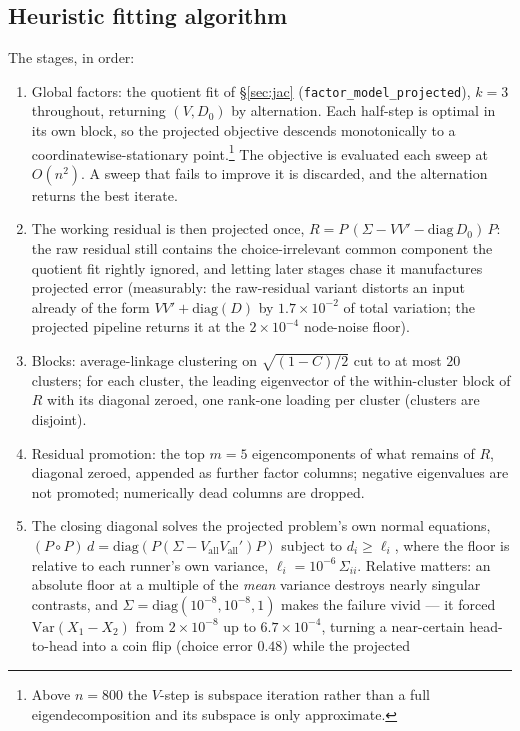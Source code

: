 \documentclass[11pt]{article}
\begin{document}
\subsection{Heuristic fitting algorithm}

The stages, in order:
\begin{enumerate}
\item Global factors: the quotient fit of \S\ref{sec:jac}
(\texttt{factor\_model\_projected}), $k=3$ throughout, returning $(V,D_0)$
by alternation. Each half-step is optimal in its own block, so the projected objective descends monotonically to a
coordinatewise-stationary point.\footnote{Above $n=800$ the $V$-step is subspace
iteration rather than a full eigendecomposition and its subspace is only
approximate.} The objective is
evaluated each sweep at $O(n^2)$. A sweep that fails to improve it is
discarded, and the alternation returns the best iterate.
\item The working residual is then
projected once, $R=P\,(\Sigma-VV'-\mathrm{diag}\,D_0)\,P$: the raw residual
still contains the choice-irrelevant common component the quotient fit
rightly ignored, and letting later stages chase it manufactures projected
error (measurably: the raw-residual variant distorts an input already of the
form $VV'+\mathrm{diag}(D)$ by $1.7\times10^{-2}$ of total variation;
the projected pipeline returns it at the $2\times10^{-4}$ node-noise
floor).
\item Blocks: average-linkage clustering on
$\sqrt{(1-C)/2}$ cut to at most $20$ clusters; for each cluster, the leading
eigenvector of the within-cluster block of $R$ with its diagonal zeroed,
one rank-one loading per cluster (clusters are disjoint).
\item Residual promotion: the top $m=5$ eigencomponents of what remains of $R$, diagonal
zeroed, appended as further factor columns; negative eigenvalues are not
promoted; numerically dead columns are dropped.
\item The closing diagonal
solves the projected problem's own normal equations,
$(P\!\circ\!P)\,d=\mathrm{diag}(P(\Sigma-V_{\mathrm{all}}V_{\mathrm{all}}')P)$
subject to $d_i\ge\ell_i$, where the floor is relative to each runner's
own variance, $\ell_i=10^{-6}\,\Sigma_{ii}$. Relative matters: an
absolute floor at a multiple of the \emph{mean} variance destroys nearly
singular contrasts, and $\Sigma=\mathrm{diag}(10^{-8},10^{-8},1)$ makes
the failure vivid --- it forced $\mathrm{Var}(X_1-X_2)$ from
$2\times10^{-8}$ up to $6.7\times10^{-4}$, turning a near-certain
head-to-head into a coin flip (choice error $0.48$) while the projected

\end{enumerate}
\end{document}
